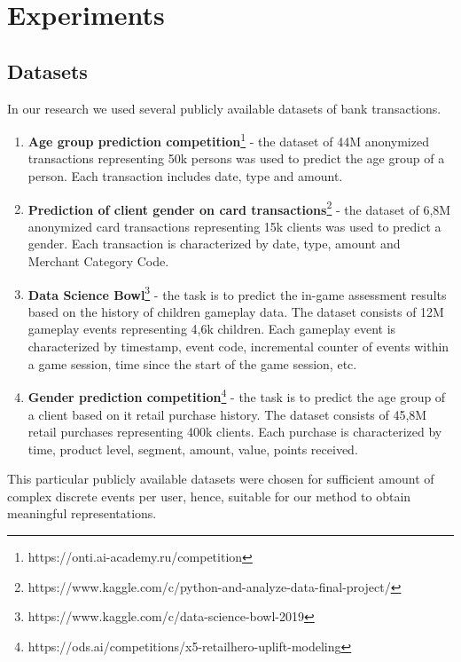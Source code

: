 \documentclass{article}
\begin{document}
\section{Experiments} \label{sec-exp}

\subsection{Datasets} \label{sec-datasets}

In our research we used several publicly available datasets of bank transactions.
\begin{enumerate}
    \item \textbf{Age group prediction competition}\footnote{https://onti.ai-academy.ru/competition} - the dataset of 44M anonymized transactions representing 50k persons was used to predict the age group of a person. Each transaction includes date, type and amount.
        
    \item \textbf{Prediction of client gender on card transactions}\footnote{https://www.kaggle.com/c/python-and-analyze-data-final-project/} - the dataset of 6,8M anonymized card transactions representing 15k clients was used to predict a gender. Each transaction is characterized by date, type, amount and Merchant Category Code.
    
    \item \textbf{Data Science Bowl}\footnote{https://www.kaggle.com/c/data-science-bowl-2019} - the task is to predict the in-game assessment results based on the history of children gameplay data. The dataset consists of 12M gameplay events representing 4,6k children. Each gameplay event is characterized by timestamp, event code, incremental counter of events within a game session, time since the start of the game session, etc.
    
    \item \textbf{Gender prediction competition}\footnote{https://ods.ai/competitions/x5-retailhero-uplift-modeling} - the task is to predict the age group of a client based on it retail purchase history. The dataset consists of 45,8M retail purchases representing 400k clients. Each purchase is characterized by time, product level, segment, amount, value, points received.
    
    
    
    
\end{enumerate}

This particular publicly available datasets were chosen for sufficient amount of complex discrete events per user, hence, suitable for our method to obtain meaningful representations. 
\end{document}
